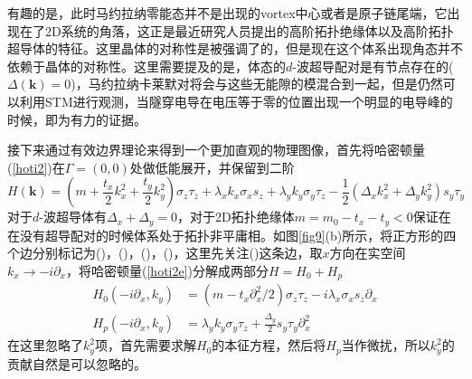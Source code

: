 有趣的是，此时马约拉纳零能态并不是出现的vortex中心或者是原子链尾端，它出现在了2D系统的角落，这正是最近研究人员提出的高阶拓扑绝缘体以及高阶拓扑超导体的特征。这里晶体的对称性是被强调了的，但是现在这个体系出现角态并不依赖于晶体的对称性。这里需要提及的是，体态的$d$-波超导配对是有节点存在的($\Delta(\mathbf{k})=0$)，马约拉纳卡莱默对将会与这些无能隙的模混合到一起，但是仍然可以利用STM进行观测，当隧穿电导在电压等于零的位置出现一个明显的电导峰的时候，即为有力的证据。

 接下来通过有效边界理论来得到一个更加直观的物理图像，首先将哈密顿量(\ref{hoti2})在$\Gamma=(0,0)$处做低能展开，并保留到二阶
\begin{equation}
H(\mathbf{k})=(m+\frac{t_x}{2}k_x^2+\frac{t_y}{2}k_y^2)\sigma_z\tau_z+\lambda_xk_x\sigma_xs_z+\lambda_yk_y\sigma_y\tau_z-\frac{1}{2}(\Delta_xk_x^2+\Delta_yk_y^2)s_y\tau_y\label{hoti2e}
\end{equation}
对于$d$-波超导体有$\Delta_x+\Delta_y=0$，对于2D拓扑绝缘体$m=m_0-t_x-t_y<0$保证在在没有超导配对的时候体系处于拓扑非平庸相。如图\ref{fig9}(b)所示，将正方形的四个边分别标记为(\uppercase\expandafter{})，(\uppercase\expandafter{})，(\uppercase\expandafter{})，(\uppercase\expandafter{})，这里先关注(\uppercase\expandafter{})这条边，取$x$方向在实空间$k_x\rightarrow-i\partial_x$，将哈密顿量(\ref{hoti2e})分解成两部分$H=H_0+H_p$
\begin{equation}
\begin{aligned}
H_0(-i\partial_x,k_y)&=(m-t_x\partial_x^2/2)\sigma_z\tau_z-i\lambda_x\sigma_xs_z\partial_x\\
H_p(-i\partial_x,k_y)&=\lambda_yk_y\sigma_y\tau_z+\frac{\Delta_y}{2}s_y\tau_y\partial_x^2
\end{aligned}
\end{equation}
在这里忽略了$k_y^2$项，首先需要求解$H_0$的本征方程，然后将$H_p$当作微扰，所以$k_y^2$的贡献自然是可以忽略的。

